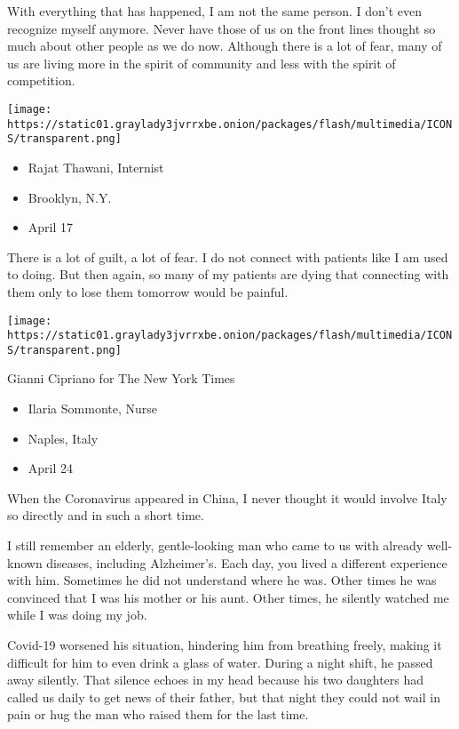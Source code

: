 With everything that has happened, I am not the same person. I don't
even recognize myself anymore. Never have those of us on the front lines
thought so much about other people as we do now. Although there is a lot
of fear, many of us are living more in the spirit of community and less
with the spirit of competition.

\texttt{[image: https://static01.graylady3jvrrxbe.onion/packages/flash/multimedia/ICONS/transparent.png]}

\begin{itemize}
\tightlist
\item
  Rajat Thawani, Internist
\item
  Brooklyn, N.Y.
\item
  April 17
\end{itemize}

There is a lot of guilt, a lot of fear. I do not connect with patients
like I am used to doing. But then again, so many of my patients are
dying that connecting with them only to lose them tomorrow would be
painful.

\texttt{[image: https://static01.graylady3jvrrxbe.onion/packages/flash/multimedia/ICONS/transparent.png]}

Gianni Cipriano for The New York Times

\begin{itemize}
\tightlist
\item
  Ilaria Sommonte, Nurse
\item
  Naples, Italy
\item
  April 24
\end{itemize}

When the Coronavirus appeared in China, I never thought it would involve
Italy so directly and in such a short time.

I still remember an elderly, gentle-looking man who came to us with
already well-known diseases, including Alzheimer's. Each day, you lived
a different experience with him. Sometimes he did not understand where
he was. Other times he was convinced that I was his mother or his aunt.
Other times, he silently watched me while I was doing my job.

Covid-19 worsened his situation, hindering him from breathing freely,
making it difficult for him to even drink a glass of water. During a
night shift, he passed away silently. That silence echoes in my head
because his two daughters had called us daily to get news of their
father, but that night they could not wail in pain or hug the man who
raised them for the last time.

